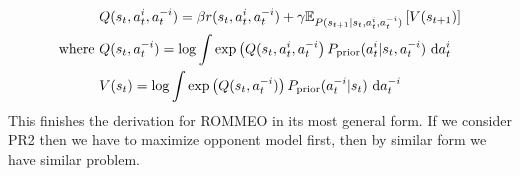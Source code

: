 \begin{equation}
    \label{eqn:chap3-final-ROMMEO}
    \begin{aligned}
        &Q(s_t, a^i_t, a^{-i}_t) = \beta r(s_t, a^i_t, a^{-i}_t) + \gamma\mathbb{E}_{P(s_{t+1} | s_t, a^i_t, a^{-i}_t)} \left[ V(s_{t+1}) \right] \\
        \text{where }&Q(s_t, a^{-i}_t) = \log \int \exp \left( Q(s_t, a^i_t, a^{-i}_t \right)P_{\text{prior}}(a^i_t | s_t, a^{-i}_t)  \ \mathrm{d} a^i_t \\ 
        &V(s_t) = \log \int \exp\left( Q(s_t, a^{-i}_t) \right)P_{\text{prior}}(a^{-i}_t | s_t) \ \mathrm{d} a^{-i}_t \\
    \end{aligned}
\end{equation}    
This finishes the derivation for ROMMEO in its most general form. If we consider PR2 then we have to maximize opponent model first, then by similar form we have similar problem.

